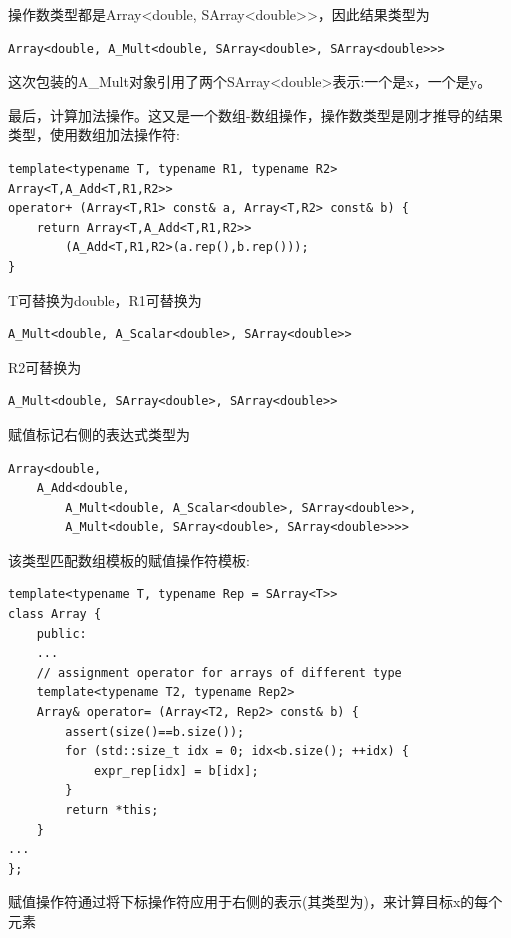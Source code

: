 操作数类型都是Array<double, SArray<double>{}>，因此结果类型为

\begin{lstlisting}[style=styleCXX]
Array<double, A_Mult<double, SArray<double>, SArray<double>>>
\end{lstlisting}

这次包装的A\_Mult对象引用了两个SArray<double>表示:一个是x，一个是y。

最后，计算加法操作。这又是一个数组-数组操作，操作数类型是刚才推导的结果类型，使用数组加法操作符:

\begin{lstlisting}[style=styleCXX]
template<typename T, typename R1, typename R2>
Array<T,A_Add<T,R1,R2>>
operator+ (Array<T,R1> const& a, Array<T,R2> const& b) {
	return Array<T,A_Add<T,R1,R2>>
		(A_Add<T,R1,R2>(a.rep(),b.rep()));
}
\end{lstlisting}

T可替换为double，R1可替换为

\begin{lstlisting}[style=styleCXX]
A_Mult<double, A_Scalar<double>, SArray<double>>
\end{lstlisting}

R2可替换为

\begin{lstlisting}[style=styleCXX]
A_Mult<double, SArray<double>, SArray<double>>
\end{lstlisting}

赋值标记右侧的表达式类型为

\begin{lstlisting}[style=styleCXX]
Array<double,
	A_Add<double,
		A_Mult<double, A_Scalar<double>, SArray<double>>,
		A_Mult<double, SArray<double>, SArray<double>>>>
\end{lstlisting}

该类型匹配数组模板的赋值操作符模板:

\begin{lstlisting}[style=styleCXX]
template<typename T, typename Rep = SArray<T>>
class Array {
	public:
	...
	// assignment operator for arrays of different type
	template<typename T2, typename Rep2>
	Array& operator= (Array<T2, Rep2> const& b) {
		assert(size()==b.size());
		for (std::size_t idx = 0; idx<b.size(); ++idx) {
			expr_rep[idx] = b[idx];
		}
		return *this;
	}
...
};
\end{lstlisting}

赋值操作符通过将下标操作符应用于右侧的表示(其类型为)，来计算目标x的每个元素

